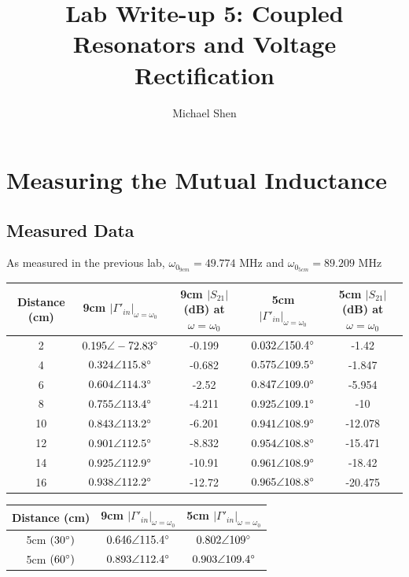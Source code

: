 \documentclass{article}
\begin{document}
\title{Lab Write-up 5: Coupled Resonators and Voltage Rectification}
\author{Michael Shen}
\maketitle


\section{Measuring the Mutual Inductance}

\subsection{Measured Data}
As measured in the previous lab, $\omega_{0_{9cm}} = 49.774$ MHz and $\omega_{0_{5cm}} = 89.209$ MHz

\begin{table}[H]
\centering
\begin{tabular}{|c|c|c|c|c|}
\hline
Distance (cm)& 9cm $\vert\Gamma '_{in}\vert_{\omega=\omega_0}$     
			 & 9cm $\vert S_{21}\vert$ (dB) at $\omega = \omega_0$
			 & 5cm $\vert\Gamma '_{in}\vert_{\omega=\omega_0}$     
			 & 5cm $\vert S_{21}\vert$ (dB) at $\omega = \omega_0$ \\ \hline
2   		 & $0.195\angle-72.83\degree$ & -0.199 & $0.032\angle150.4\degree$  & -1.42   \\ \hline
4   	 	 & $0.324\angle115.8\degree$  & -0.682 & $0.575\angle109.5\degree$  & -1.847  \\ \hline
6   	 	 & $0.604\angle114.3\degree$  & -2.52  & $0.847\angle109.0\degree$  & -5.954  \\ \hline
8		     & $0.755\angle113.4\degree$  & -4.211 & $0.925\angle109.1\degree$  & -10     \\ \hline
10  		 & $0.843\angle113.2\degree$  & -6.201 & $0.941\angle108.9\degree$  & -12.078 \\ \hline
12 			 & $0.901\angle112.5\degree$  & -8.832 & $0.954\angle108.8\degree$  & -15.471 \\ \hline
14 			 & $0.925\angle112.9\degree$  & -10.91 & $0.961\angle108.9\degree$  & -18.42  \\ \hline
16  		 & $0.938\angle112.2\degree$  & -12.72 & $0.965\angle108.8\degree$  & -20.475 \\ \hline
\end{tabular}
\end{table}

\begin{table}[h]
\centering
\begin{tabular}{|c|c|c|}
\hline
Distance (cm)	  & 9cm $\vert\Gamma '_{in}\vert_{\omega=\omega_0}$      
			 	  & 5cm $\vert\Gamma '_{in}\vert_{\omega=\omega_0}$ \\ \hline
5cm $(30\degree)$ & $0.646\angle115.4\degree$ & $0.802\angle109\degree$   \\ \hline
5cm $(60\degree)$ & $0.893\angle112.4\degree$ & $0.903\angle109.4\degree$ \\ \hline
\end{tabular}
\end{table}
\end{document}
